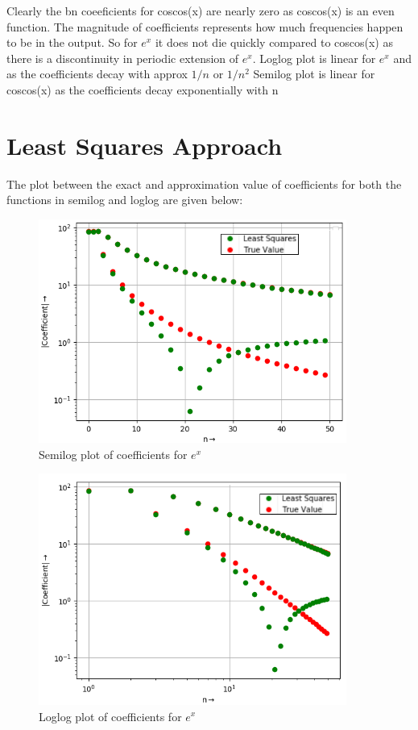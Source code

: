 \documentclass[10pt,a4paper]{article}
\begin{document}
Clearly the bn coeeficients for coscos(x) are nearly zero as coscos(x) is an even function.
The magnitude of coefficients represents how much frequencies happen to be in the output.
So for $e^{x}$ it does not die quickly compared to coscos(x) as there is a discontinuity in periodic extension of $e^{x}$.
Loglog plot is linear for $e^{x}$ and as the coefficients decay with approx $1/n$ or $1/n^{2}$ 
Semilog plot is linear for coscos(x) as the coefficients decay exponentially with n

\section{Least Squares Approach}
The plot between the exact and approximation value of coefficients for both the functions in semilog and loglog are given below:
\begin{figure}[!tbh]
\includegraphics[width = 0.9\textwidth]{5a1.png}
\caption{Semilog plot of coefficients for $e^{x}$}
\end{figure} 

\begin{figure}[!tbh]
\includegraphics[width = 0.9\textwidth]{5a2.png}
\caption{Loglog plot of coefficients for $e^{x}$}
\end{figure} 
\end{document}
